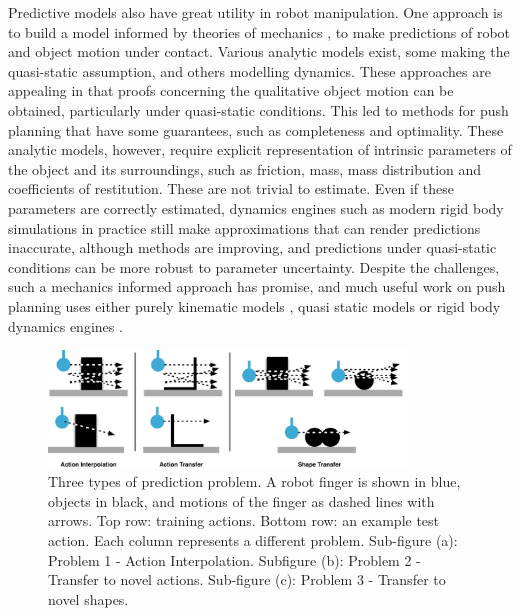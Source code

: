 Predictive models also have great utility in robot manipulation. One approach is to build a model informed by theories of mechanics \citep{mason_manipulator_1982,lynch_mechanics_1992,lynchmason96,peshkin_motion_1988,cappelleri_designing_2006,mason_mechanics_2001,flickinger2015},  to make predictions of robot and object motion under contact. Various analytic models exist, some making the quasi-static assumption, and others modelling dynamics. These approaches are appealing in that proofs concerning the qualitative object motion can be obtained, particularly under quasi-static conditions. This led to methods for push planning that have some guarantees, such as completeness and optimality. These analytic models, however, require explicit representation of intrinsic parameters of the object and its surroundings, such as friction, mass, mass distribution and coefficients of restitution. These are not trivial to estimate. Even if these parameters are correctly estimated, dynamics engines such as modern rigid body simulations in practice still make approximations that can render predictions inaccurate, although methods are improving, and predictions under quasi-static conditions can be more robust to parameter uncertainty. Despite the challenges, such a mechanics informed approach has promise, and much useful work on push planning uses either purely kinematic models \citep{stillman08ijrr}, quasi static models \citep{Dogar_2010,lynchmason96} or rigid body dynamics engines \cite{zitoetal-iros12,Cosgun2011}. 

\def\stackalignment{l}
\begin{figure}[t]
\centerline{\includegraphics[width=0.85\textwidth]{three-prediction-problems}}
\caption{Three types of prediction problem. A robot finger is shown in blue, objects in black, and motions of the finger as dashed lines with arrows. Top row: training actions. Bottom row: an example test action. Each column represents a different problem. Sub-figure (a): Problem 1 - Action Interpolation. Subfigure (b): Problem 2 - Transfer to novel actions. Sub-figure (c): Problem 3 - Transfer to novel shapes. \label{fig:three-prediction-problems}}
\end{figure}

